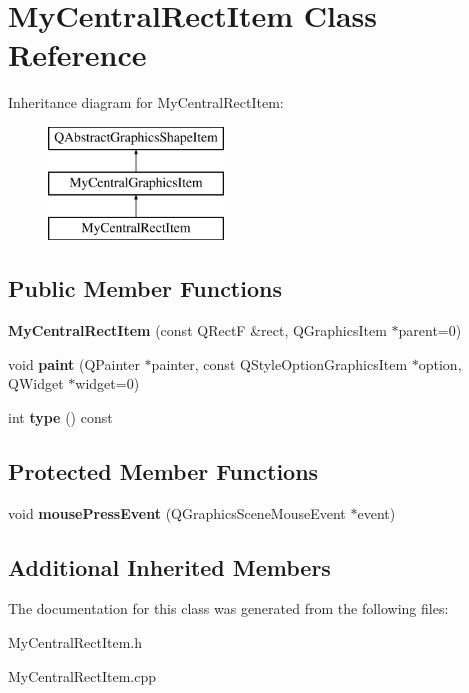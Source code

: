 \hypertarget{class_my_central_rect_item}{}\section{My\+Central\+Rect\+Item Class Reference}
\label{class_my_central_rect_item}
Inheritance diagram for My\+Central\+Rect\+Item\+:\begin{figure}[H]
\begin{center}
\leavevmode
\includegraphics[height=3.000000cm]{class_my_central_rect_item}
\end{center}
\end{figure}
\subsection*{Public Member Functions}
\begin{DoxyCompactItemize}
\item 
\hypertarget{class_my_central_rect_item_a7edf24741fb0098e78dea7079d2983f3}{}{\bfseries My\+Central\+Rect\+Item} (const Q\+Rect\+F \&rect, Q\+Graphics\+Item $\ast$parent=0)\label{class_my_central_rect_item_a7edf24741fb0098e78dea7079d2983f3}

\item 
\hypertarget{class_my_central_rect_item_a87c70071f69fb8fc4142af545447f326}{}void {\bfseries paint} (Q\+Painter $\ast$painter, const Q\+Style\+Option\+Graphics\+Item $\ast$option, Q\+Widget $\ast$widget=0)\label{class_my_central_rect_item_a87c70071f69fb8fc4142af545447f326}

\item 
\hypertarget{class_my_central_rect_item_a4b970e08db43fd6b8f18dce8114458c2}{}int {\bfseries type} () const \label{class_my_central_rect_item_a4b970e08db43fd6b8f18dce8114458c2}

\end{DoxyCompactItemize}
\subsection*{Protected Member Functions}
\begin{DoxyCompactItemize}
\item 
\hypertarget{class_my_central_rect_item_ac6ed556955ad6f3c2643311e3de22f7a}{}void {\bfseries mouse\+Press\+Event} (Q\+Graphics\+Scene\+Mouse\+Event $\ast$event)\label{class_my_central_rect_item_ac6ed556955ad6f3c2643311e3de22f7a}

\end{DoxyCompactItemize}
\subsection*{Additional Inherited Members}


The documentation for this class was generated from the following files\+:\begin{DoxyCompactItemize}
\item 
My\+Central\+Rect\+Item.\+h\item 
My\+Central\+Rect\+Item.\+cpp\end{DoxyCompactItemize}
